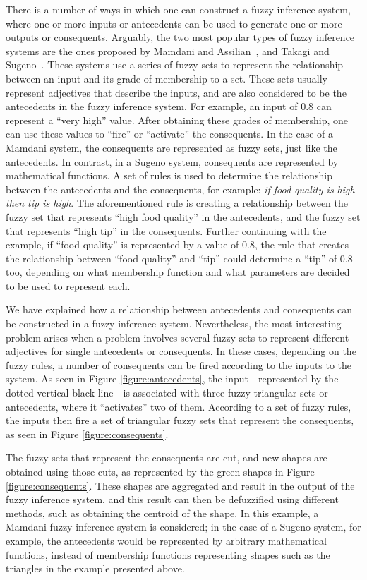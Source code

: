 \documentclass{ieeeaccess}
\begin{document}
There is a number of ways in which one can construct a fuzzy inference system,
where one or more inputs or antecedents can be used to generate one or more
outputs or consequents. Arguably, the two most popular types of fuzzy inference
systems are the ones proposed by Mamdani and Assilian~\cite{Mamdani1975}, and
Takagi and Sugeno~\cite{Takagi1985}. These systems use a series of fuzzy sets to
represent the relationship between an input and its grade of membership to a
set. These sets usually represent adjectives that describe the inputs, and are
also considered to be the antecedents in the fuzzy inference system. For
example, an input of 0.8 can represent a ``very high'' value. After obtaining
these grades of membership, one can use these values to ``fire'' or ``activate''
the consequents. In the case of a Mamdani system, the consequents are
represented as fuzzy sets, just like the antecedents. In contrast, in a Sugeno
system, consequents are represented by mathematical functions. A set of rules is
used to determine the relationship between the antecedents and the consequents,
for example: \textit{if food quality is high then tip is high}. The
aforementioned rule is creating a relationship between the fuzzy set that
represents ``high food quality'' in the antecedents, and the fuzzy set that
represents ``high tip'' in the consequents. Further continuing with the example,
if ``food quality'' is represented by a value of 0.8, the rule that creates the
relationship between ``food quality'' and ``tip'' could determine a ``tip'' of
0.8 too, depending on what membership function and what parameters are decided
to be used to represent each.

We have explained how a relationship between antecedents and consequents can
be constructed in a fuzzy inference system. Nevertheless, the most interesting
problem arises when a problem involves several fuzzy sets to represent different
adjectives for single antecedents or consequents. In these cases, depending on
the fuzzy rules, a number of consequents can be fired according to the inputs to
the system. As seen in Figure \ref{figure:antecedents}, the input---represented
by the dotted vertical black line---is associated with three fuzzy
triangular sets or antecedents, where it ``activates'' two of them. According to
a set of fuzzy rules, the inputs then fire a set of triangular fuzzy sets that
represent the consequents, as seen in Figure \ref{figure:consequents}.

The fuzzy sets that represent the consequents are cut, and new shapes are
obtained using those cuts, as represented by the green shapes in Figure
\ref{figure:consequents}. These shapes are aggregated and result in the output
of the fuzzy inference system, and this result can then be defuzzified using
different methods, such as obtaining the centroid of the shape. In this example,
a Mamdani fuzzy inference system is considered; in the case of a Sugeno system,
for example, the antecedents would be represented by arbitrary mathematical
functions, instead of membership functions representing shapes such as the
triangles in the example presented above.
\end{document}
